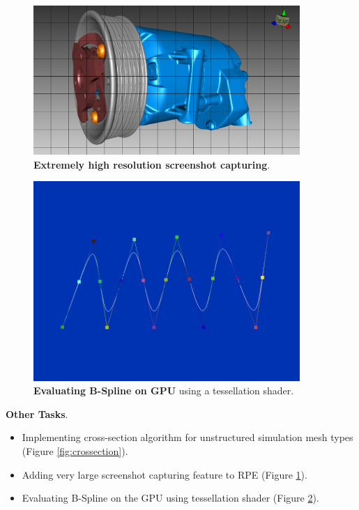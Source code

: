 \documentclass[]{report}
\begin{document}
\begin{figure}[!ht]
	\centering
	\includegraphics[width=0.90\textwidth]{./figs/highresscreenshot.png}
	\caption[Extremely high resolution screenshot capturing]{\textbf{Extremely high resolution screenshot capturing}.}
	\label{fig:highres}
\end{figure}

\begin{figure}[!ht]
	\centering
	\includegraphics[width=0.90\textwidth]{./figs/bspline.png}
	\caption[B-Spline GPU Tessellation]{\textbf{Evaluating B-Spline on GPU} using a tessellation shader.}
	\label{fig:bspline}
\end{figure}

\textbf{Other Tasks}.
\begin{itemize}
	\item Implementing cross-section algorithm for unstructured simulation mesh types (Figure \ref{fig:crossection}).
	\item Adding very large screenshot capturing feature to RPE (Figure \ref{fig:highres}).
	\item Evaluating B-Spline on the GPU using tessellation shader (Figure \ref{fig:bspline}).
\end{itemize}
\end{document}
